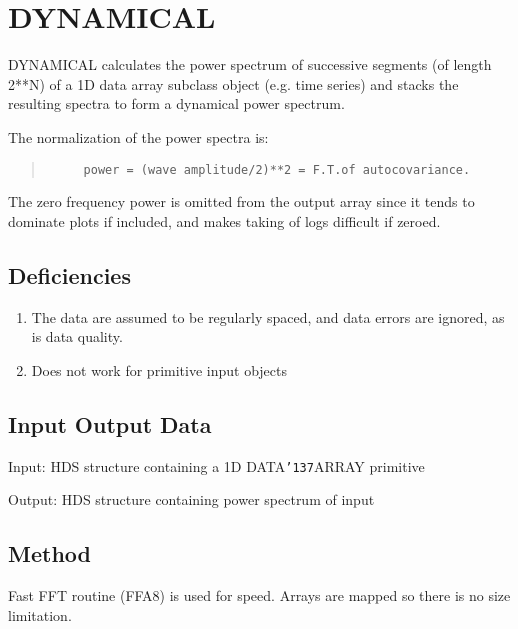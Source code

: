 \documentclass{book}
\renewcommand{\_}{{\tt\char'137}}     %
\begin{document}
\section{DYNAMICAL}
DYNAMICAL calculates the power spectrum of successive segments
(of length 2**N) of a 1D data array subclass object (e.g. time
series) and stacks the resulting spectra to form a dynamical
power spectrum.

The normalization of the power spectra is:

\begin{quote}\begin{verbatim}
     power = (wave amplitude/2)**2 = F.T.of autocovariance.
\end{verbatim}\end{quote}
The zero frequency power is omitted from the output array since
it tends to dominate plots if included, and makes taking of logs
difficult if zeroed.

\subsection{Deficiencies}

\begin{enumerate}
\item The data are assumed to be regularly spaced, and
data errors are ignored, as is data quality.
\item Does not work for primitive input objects
\end{enumerate}
\subsection{Input Output Data}
Input: HDS structure containing a 1D DATA\_ARRAY primitive

Output: HDS structure containing power spectrum of input

\subsection{Method}
Fast FFT routine (FFA8) is used for speed. Arrays are mapped so
there is no size limitation.
\end{document}
